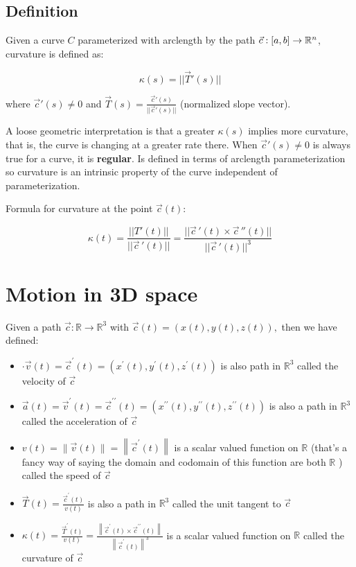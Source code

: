 \subsection{Definition}

Given a curve $C$ parameterized with arclength by the path $\vec{c}:[a,b]\rightarrow \mathbb{R}^n$,
curvature is defined as:

\[\boxed{\kappa(s)=||\vec{T}'(s)||}\]

where $\vec{c}'(s)\neq 0$ and $\vec{T}(s)=\frac{\vec{c}'(s)}{||\vec{c}'(s)||}$ (normalized slope vector).\newline

A loose geometric interpretation is that a greater $\kappa(s)$ implies
more curvature, that is, the curve is changing at a greater rate there.
When $\vec{c}'(s)\neq 0$ is always true for a curve, it is \textbf{regular}.
Is defined in terms of arclength parameterization so curvature
is an intrinsic property of the curve independent of parameterization.\newline

\noindent
Formula for curvature at the point $\vec{c}(t)$:

\[\boxed{\kappa(t)=\frac{||T'(t)||}{||\vec{c}\,'(t)||}=\frac{||\vec{c}\,'(t)\times \vec{c}\,''(t)||}{||\vec{c}\,'(t)||^3}}\]

\section{Motion in 3D space}

Given a path $\vec{c}: \mathbb{R} \rightarrow \mathbb{R}^{3}$ with $\vec{c}(t)=(x(t), y(t), z(t)),$ then we have defined:
\begin{itemize}
    \item $\cdot \vec{v}(t)=\vec{c}^{\prime}(t)=\left(x^{\prime}(t), y^{\prime}(t), z^{\prime}(t)\right)$ is also path in $\mathbb{R}^{3}$ called the velocity of $\vec{c}$
    \item $\vec{a}(t)=\vec{v}^{\prime}(t)=\vec{c}^{\prime \prime}(t)=\left(x^{\prime \prime}(t), y^{\prime \prime}(t), z^{\prime \prime}(t)\right)$ is also a path in $\mathbb{R}^{3}$ called the acceleration of $\vec{c}$
    \item $v(t)=\|\vec{v}(t)\|=\left\|\vec{c}^{\prime}(t)\right\|$ is a scalar valued function on $\mathbb{R}$ (that's a fancy way of saying the domain and codomain of this function are both $\mathbb{R}$ ) called the speed of $\vec{c}$
    \item $\vec{T}(t)=\frac{\vec{c}^{\prime}(t)}{v(t)}$ is also a path in $\mathbb{R}^{3}$ called the unit tangent to $\vec{c}$
    \item $\kappa(t)=\frac{\vec{T}^{\prime}(t)}{v(t)}=\frac{\left\|\vec{c}^{\prime}(t) \times \vec{c}^{\prime \prime}(t)\right\|}{\left\|\vec{c}^{\prime}(t)\right\|^{3}}$ is a scalar valued function on $\mathbb{R}$ called the curvature of $\vec{c}$
\end{itemize}

